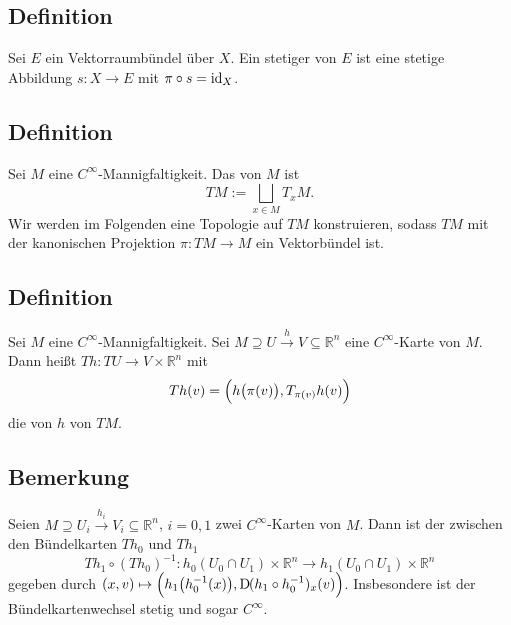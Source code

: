 \subsection[Definition: Schnitt eines Vektorbündels]{Definition} %
\label{sub:194}
Sei $E$ ein Vektorraumbündel über $X$. Ein stetiger  von $E$ ist eine stetige Abbildung $s : X \to E$ mit $\pi \circ s = \id_X$.

\subsection[Definition: Tangentialbündel]{Definition} %
\label{sub:195}
Sei $M$ eine $C^\infty$-Mannigfaltigkeit. Das  von $M$ ist 
\[
	T M := \bigsqcup_{x \in M} T_x M.
\]
Wir werden im Folgenden eine Topologie auf $T M$ konstruieren, sodass $T M$ mit der kanonischen Projektion $\pi : T M \to M$ ein Vektorbündel ist.

\subsection[Definition: Induzierte Bündelkarte]{Definition} %
\label{sub:196}
Sei $M$ eine $C^\infty$-Mannigfaltigkeit. Sei $M \supseteq U \xrightarrow{\, h \,} V \subseteq \mathds{R}^n$ eine $C^\infty$-Karte von $M$. Dann heißt 
$T h : T U \to V \times \mathds{R}^n$ mit 
\[
	T h (v) = \enbrace[\Big]{h \enbrace[\big]{\pi(v)}, T_{\pi(v)} h (v)}  
\]
die von $h$  von $T M$. 

\subsection[Bemerkung: Bündelkartenwechsel]{Bemerkung} %
\label{sub:197}
Seien $M \supseteq U_i \xrightarrow{\, h_i \,} V_i \subseteq \mathds{R}^n $, $i=0,1$ zwei $C^\infty$-Karten von $M$. Dann ist der  zwischen den 
Bündelkarten $T h_0$ und $T h_1$
\[
	T h_1 \circ (T h_0) ^{-1} : h_0(U_0 \cap U_1) \times \mathds{R}^n \longrightarrow h_1(U_0 \cap U_1) \times \mathds{R}^n
\]
gegeben durch $(x,v) \mapsto \enbrace[\Big]{h_1 \enbrace*{h_0^{-1}(x)}, \D ( h_1 \circ h_0 ^{-1})_x (v)}$. Insbesondere ist der Bündelkartenwechsel stetig und sogar 
$C^\infty$.

